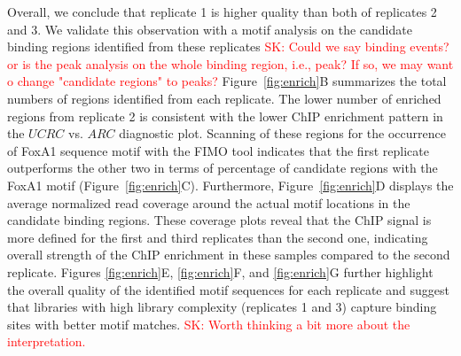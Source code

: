 \documentclass{bmcart}
\newcommand{\SK}[1]{\textcolor{red}{SK: #1}}
\begin{document}
Overall, we conclude that replicate 1 is higher quality than both  of replicates 2 and 3.
We validate this observation with a motif analysis on the candidate binding regions identified from these replicates \SK{Could we say binding events? or is the peak analysis on the whole binding region, i.e., peak? If so, we may want o change "candidate regions" to peaks?} 
Figure~\ref{fig:enrich}B summarizes the total numbers of regions identified from each replicate. The lower number of enriched regions from replicate 2 is consistent with the lower ChIP enrichment pattern in the $UCRC$ vs. $ARC$ diagnostic plot.  Scanning of these regions for the occurrence of FoxA1 sequence motif with the FIMO tool \cite{fimo} indicates that the first replicate outperforms the other two in terms of percentage of candidate regions with the FoxA1 motif (Figure~\ref{fig:enrich}C).
Furthermore, Figure~\ref{fig:enrich}D displays the average normalized
read coverage around the actual motif locations in the candidate binding regions.
These coverage plots reveal that the ChIP signal is more defined for
the first and third replicates than the second one, indicating overall strength of the ChIP enrichment in these samples compared to the second replicate.
Figures \ref{fig:enrich}E, \ref{fig:enrich}F, and
\ref{fig:enrich}G further highlight the overall quality of the identified motif sequences for each replicate and suggest  that libraries with high library complexity (replicates 1 and 3) capture binding sites with better motif matches.
\SK{Worth thinking a bit more about the interpretation.}

\end{document}
